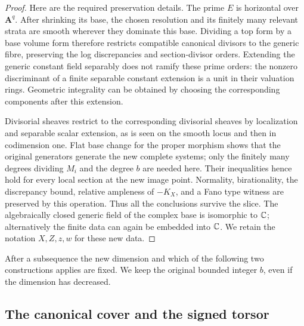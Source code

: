 \begin{proof}
Here are the required preservation details.  The prime $E$ is horizontal
over $\mathbf A^q$.  After shrinking its base, the chosen resolution and
its finitely many relevant strata are smooth wherever they dominate this
base.  Dividing a top form by a base volume form therefore restricts
compatible canonical divisors to the generic fibre, preserving the
log discrepancies and section-divisor orders.  Extending the generic
constant field separably does not ramify these prime orders: the
nonzero discriminant of a finite separable constant extension is a unit
in their valuation rings.  Geometric integrality can be obtained by
choosing the corresponding components after this extension.

Divisorial sheaves restrict to the corresponding divisorial sheaves by
localization and separable scalar extension, as is seen on the smooth
locus and then in codimension one.  Flat base change for the proper morphism
shows that the original generators generate the new complete systems;
only the finitely many degrees dividing $M_i$ and the degree $b$ are
needed here.  Their inequalities hence hold for every local section at
the new image point.  Normality, birationality, the discrepancy bound,
relative ampleness of $-K_X$, and a Fano type witness are preserved by
this operation.  Thus all the conclusions survive the slice.  The
algebraically closed generic field of the complex base is isomorphic
to $\mathbb C$; alternatively the finite data can again be embedded into $\mathbb C$.
We retain the notation $X,Z,z,w$ for these new data.
\end{proof}

After a subsequence the new dimension and which of the following two
constructions applies are fixed.  We keep the original bounded integer
$b$, even if the dimension has decreased.

\subsection{The canonical cover and the signed torsor}

